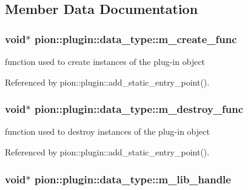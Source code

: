 \subsection{Member Data Documentation}
\hypertarget{structpion_1_1plugin_1_1data__type_a11bd2c34a50310a4ed6042eae415c0c4}{
\subsubsection[{m\-\_\-create\-\_\-func}]{\setlength{\rightskip}{0pt plus 5cm}void$\ast$ pion\-::plugin\-::data\-\_\-type\-::m\-\_\-create\-\_\-func}}\label{structpion_1_1plugin_1_1data__type_a11bd2c34a50310a4ed6042eae415c0c4}


function used to create instances of the plug-\/in object 



Referenced by pion\-::plugin\-::add\-\_\-static\-\_\-entry\-\_\-point().

\hypertarget{structpion_1_1plugin_1_1data__type_a19893ea2b05e69dfb2b346ee5f7aea41}{
\subsubsection[{m\-\_\-destroy\-\_\-func}]{\setlength{\rightskip}{0pt plus 5cm}void$\ast$ pion\-::plugin\-::data\-\_\-type\-::m\-\_\-destroy\-\_\-func}}\label{structpion_1_1plugin_1_1data__type_a19893ea2b05e69dfb2b346ee5f7aea41}


function used to destroy instances of the plug-\/in object 



Referenced by pion\-::plugin\-::add\-\_\-static\-\_\-entry\-\_\-point().

\hypertarget{structpion_1_1plugin_1_1data__type_ab53016d3d93ba84c07490a413fd01bcf}{
\subsubsection[{m\-\_\-lib\-\_\-handle}]{\setlength{\rightskip}{0pt plus 5cm}void$\ast$ pion\-::plugin\-::data\-\_\-type\-::m\-\_\-lib\-\_\-handle}}\label{structpion_1_1plugin_1_1data__type_ab53016d3d93ba84c07490a413fd01bcf}


